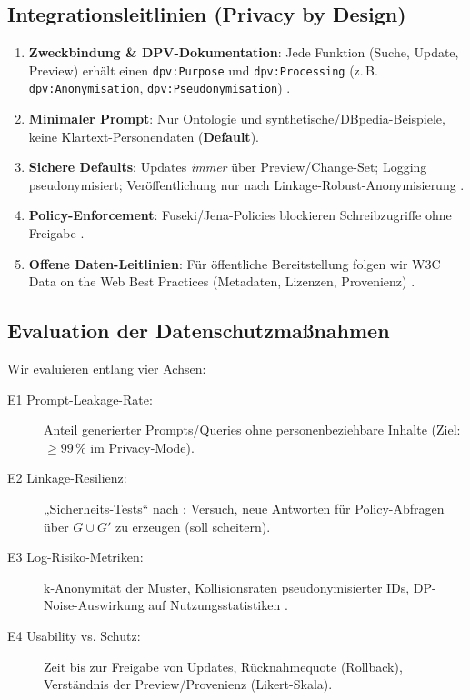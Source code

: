 \subsection{Integrationsleitlinien (Privacy by Design)}
\label{subsec:pbdesign}

\begin{enumerate}
  \item \textbf{Zweckbindung \& DPV-Dokumentation}: Jede Funktion (Suche, Update, Preview) erhält einen \texttt{dpv:Purpose} und \texttt{dpv:Processing} (z.\,B. \texttt{dpv:Anonymisation}, \texttt{dpv:Pseudonymisation}) \cite{dpv_w3c_note}.
  \item \textbf{Minimaler Prompt}: Nur Ontologie und synthetische/DBpedia-Beispiele, keine Klartext-Personendaten (\textbf{Default}).
  \item \textbf{Sichere Defaults}: Updates \emph{immer} über Preview/Change-Set; Logging pseudonymisiert; Veröffentlichung nur nach Linkage-Robust-Anonymisierung \cite{delanaux_rdf_graph_anonymization_linkage,cuenca_kostylev_logical_foundations_ppdp_ld}.
  \item \textbf{Policy-Enforcement}: Fuseki/Jena-Policies blockieren Schreibzugriffe ohne Freigabe \cite{jena_fuseki_access_control_docs,jena_permissions_docs}.
  \item \textbf{Offene Daten-Leitlinien}: Für öffentliche Bereitstellung folgen wir W3C Data on the Web Best Practices (Metadaten, Lizenzen, Provenienz) \cite{w3c_dwbp_2017}.
\end{enumerate}

\subsection{Evaluation der Datenschutzmaßnahmen}
\label{subsec:eval-privacy}

Wir evaluieren entlang vier Achsen:

\begin{description}
  \item[E1 Prompt-Leakage-Rate:] Anteil generierter Prompts/Queries ohne personenbeziehbare Inhalte (Ziel: $\geq 99\,\%$ im Privacy-Mode).
  \item[E2 Linkage-Resilienz:] „Sicherheits-Tests“ nach \cite{delanaux_rdf_graph_anonymization_linkage}: Versuch, neue Antworten für Policy-Abfragen über $G\cup G'$ zu erzeugen (soll scheitern).
  \item[E3 Log-Risiko-Metriken:] k-Anonymität der Muster, Kollisionsraten pseudonymisierter IDs, DP-Noise-Auswirkung auf Nutzungsstatistiken \cite{goetz2012publishing_search_logs,navarro_arribas2012_user_kanon_querylogs}.
  \item[E4 Usability vs. Schutz:] Zeit bis zur Freigabe von Updates, Rücknahmequote (Rollback), Verständnis der Preview/Provenienz (Likert-Skala).
\end{description}

